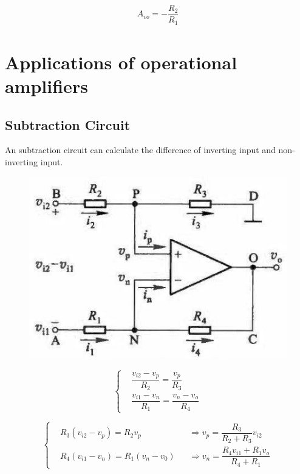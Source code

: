 \begin{equation*}
  \begin{aligned}
    A_{vo} = - \dfrac{R_2}{R_1} 
  \end{aligned}
\end{equation*}

\section{Applications of operational amplifiers}

\subsection{Subtraction Circuit}

An subtraction circuit can calculate the difference of inverting input and non-inverting input.

\begin{figure}[H]
  \centering
  \includegraphics[width=0.6\linewidth]{figures/subtraction-amplifier}
\end{figure}

\begin{equation*}
  \left\{
    \begin{aligned}
      & \dfrac{v_{i2} - v_p}{R_2} = \dfrac{v_p}{R_3} \\
      & \dfrac{v_{i1} - v_n}{R_1} = \dfrac{v_n - v_o}{R_4}  
    \end{aligned}
  \right.
\end{equation*}

\begin{equation*}
  \left\{
  \begin{aligned}
    & R_3 \left( v_{i2} - v_p \right) = R_2 v_p && \Rightarrow v_p = \dfrac{R_3}{R_2 + R_3} v_{i2} \\
    & R_4 \left( v_{i1} - v_n \right) = R_1 \left( v_n - v_0 \right) && \Rightarrow v_n = \dfrac{R_4 v_{i1} + R_1 v_o}{R_4 + R_1}
  \end{aligned}
  \right.
\end{equation*}

